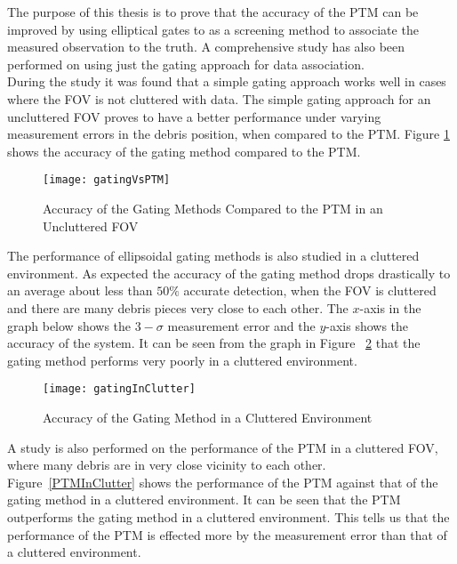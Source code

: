 \documentclass[]{aiaa-tc}%
\begin{document}
The purpose of this thesis is to prove that the accuracy of the PTM can be improved by using elliptical gates to as a screening method to associate the measured observation to the truth. A comprehensive study has also been performed on using just the gating approach for data association.\\ 

During the study it was found that a simple gating approach works well in cases where the FOV is not cluttered with data. The simple gating approach for an uncluttered FOV proves to have a better performance under varying measurement errors in the debris position, when compared to the PTM. Figure \ref{GatingVsPTM} shows the accuracy of the gating method compared to the PTM.\\
\begin{figure}[h]
\centering
\texttt{[image: gatingVsPTM]}
\caption{Accuracy of the Gating Methods Compared to the PTM in an Uncluttered FOV}
\label{GatingVsPTM}
\end{figure}

The performance of ellipsoidal gating methods is also studied in a cluttered environment. As expected the accuracy of the gating method drops drastically to an average about less than $50\%$ accurate detection,  when the FOV is cluttered and there are many debris pieces very close to each other. The $x$-axis in the graph below shows the $3-\sigma$ measurement error and the $y$-axis shows the accuracy of the system. It can be seen from the graph in Figure ~\ref{gatingInClutter} that the gating method performs very poorly in a cluttered environment.\\

\begin{figure}[h]
\centering
\texttt{[image: gatingInClutter]}
\caption{Accuracy of the Gating Method in a Cluttered Environment}
\label{gatingInClutter}
\end{figure}

A study is also performed on the performance of the PTM in a cluttered FOV, where many debris are in very close vicinity to each other. Figure~\ref{PTMInClutter} shows the performance of the PTM against that of the gating method in a cluttered environment. It can be seen that the PTM outperforms the gating method in a cluttered environment. This tells us that the performance of the PTM is effected more by the measurement error than that of a cluttered environment.\\
\end{document}

